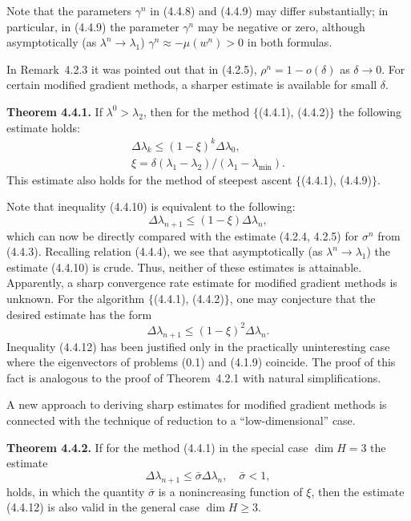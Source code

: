 \documentclass[11pt,oneside]{book}
\begin{document}
Note that the parameters $\gamma^n$ in (4.4.8) and (4.4.9) may differ substantially; in particular, in (4.4.9) the parameter $\gamma^n$ may be negative or zero, although asymptotically (as $\lambda^n \to \lambda_1$) $\gamma^n \approx -\mu(w^n) > 0$ in both formulas.

In Remark~4.2.3 it was pointed out that in (4.2.5), $\rho^n = 1 - o(\delta)$ as $\delta \to 0$. For certain modified gradient methods, a sharper estimate is available for small $\delta$.

\textbf{Theorem 4.4.1.} If $\lambda^0 > \lambda_2$, then for the method $\{$(\textup{4.4.1}), (\textup{4.4.2})$\}$ the following estimate holds:
\begin{gather*}
\Delta\lambda_k \leqslant (1 - \xi)^k \Delta\lambda_0, \tag{4.4.10} \\
\xi = \delta(\lambda_1 - \lambda_2)/(\lambda_1 - \lambda_{\min}).
\end{gather*}
This estimate also holds for the method of steepest ascent $\{$(\textup{4.4.1}), (\textup{4.4.9})$\}$.

Note that inequality (4.4.10) is equivalent to the following:
\[
\Delta\lambda_{n+1} \leqslant (1 - \xi)\Delta\lambda_n, \tag{4.4.11}
\]
which can now be directly compared with the estimate (4.2.4, 4.2.5) for $\sigma^n$ from (4.4.3). Recalling relation (4.4.4), we see that asymptotically (as $\lambda^n \to \lambda_1$) the estimate (4.4.10) is crude. Thus, neither of these estimates is attainable. Apparently, a sharp convergence rate estimate for modified gradient methods is unknown. For the algorithm $\{$(\textup{4.4.1}), (\textup{4.4.2})$\}$, one may conjecture that the desired estimate has the form
\[
\Delta\lambda_{n+1} \leqslant (1 - \xi)^2 \Delta\lambda_n. \tag{4.4.12}
\]
Inequality (4.4.12) has been justified only in the practically uninteresting case where the eigenvectors of problems (0.1) and (4.1.9) coincide. The proof of this fact is analogous to the proof of Theorem~4.2.1 with natural simplifications.

A new approach to deriving sharp estimates for modified gradient methods is connected with the technique of reduction to a ``low-dimensional'' case.

\textbf{Theorem 4.4.2.} If for the method (4.4.1) in the special case $\dim H = 3$ the estimate
\[
\Delta\lambda_{n+1} \leqslant \bar{\sigma} \Delta\lambda_n, \quad \bar{\sigma} < 1, \tag{4.4.12} %
\]
holds, in which the quantity $\bar{\sigma}$ is a nonincreasing function of $\xi$, then the estimate (4.4.12) is also valid in the general case $\dim H \geqslant 3$.
\end{document}
